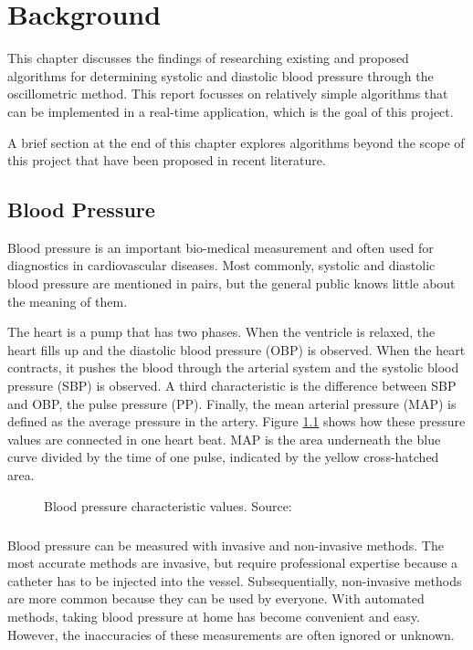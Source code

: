 \chapter{Background}\label{cp:theory} %
This chapter discusses the findings of researching existing and proposed algorithms for determining systolic and diastolic blood pressure through the oscillometric method. This report focusses on relatively simple algorithms that can be implemented in a real-time application, which is the goal of this project.

A brief section at the end of this chapter explores algorithms beyond the scope of this project that have been proposed in recent literature.
\section{Blood Pressure}
Blood pressure is an important bio-medical measurement and often used for  diagnostics in cardiovascular diseases. Most commonly, systolic and diastolic blood pressure are mentioned in pairs, but the general public knows little about the meaning of them.

The heart is a pump that has two phases. When the ventricle is relaxed, the heart fills up and the diastolic blood pressure (OBP) is observed. When the heart contracts, it pushes the blood through the arterial system and the systolic blood pressure (SBP) is observed. A third characteristic is the difference between SBP and OBP, the pulse pressure (PP). Finally, the mean arterial pressure (MAP) is defined as the average pressure in the artery. Figure \ref{fig:BP} shows how these pressure values are connected in one heart beat. MAP is the area underneath the blue curve divided by the time of one pulse, indicated by the yellow cross-hatched area. \cite{Boron2012}

\begin{figure}
\centering
\caption{Blood pressure characteristic values. Source: \cite{Boron2012}}
\label{fig:BP}
\end{figure}

\paragraph{}

Blood pressure can be measured with invasive and non-invasive methods. The most accurate methods are invasive, but require professional expertise because a catheter has to be injected into the vessel. Subsequentially, non-invasive methods are more common because they can be used by everyone. With automated methods, taking blood pressure at home has become convenient and easy. However, the inaccuracies of these measurements are often ignored or unknown.

